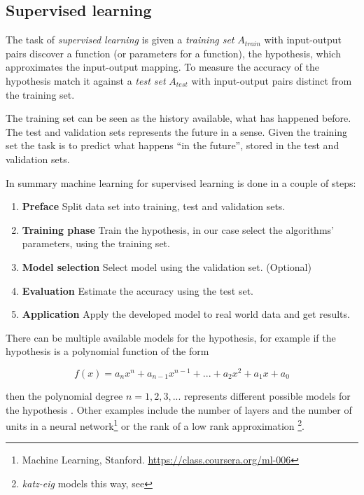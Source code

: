 
\subsection{Supervised learning}\label{sec:background:theory:suplearn}

The task of \textit{supervised learning} is given a \textit{training set} $A_{train}$ with input-output pairs discover a function (or parameters for a function), the hypothesis, which approximates the input-output mapping.  To measure the accuracy of the hypothesis match it against a \textit{test set} $A_{test}$ with input-output pairs distinct from the training set.
\citep{norvigAI}

The training set can be seen as the history available, what has happened before. The test and validation sets represents the future in a sense. Given the training set the task is to predict what happens ``in the future'', stored in the test and validation sets.

In summary machine learning for supervised learning is done in a couple of steps:

\begin{enumerate}
    \item \textbf{Preface} Split data set into training, test and validation sets.
    \item \textbf{Training phase} Train the hypothesis, in our case select the algorithms' parameters, using the training set.
    \item \textbf{Model selection} Select model using the validation set. (Optional)
    \item \textbf{Evaluation} Estimate the accuracy using the test set.
    \item \textbf{Application} Apply the developed model to real world data and get results.
\end{enumerate}

There can be multiple available models for the hypothesis, for example if the hypothesis is a polynomial function of the form

\begin{equation}
f(x) = a_n x^n + a_{n - 1} x^{n - 1} + ... + a_2 x^2 + a_1 x + a_0
\end{equation}

then the polynomial degree $n = 1, 2, 3, ...$ represents different possible models for the hypothesis \citep{norvigAI}. Other examples include the number of layers and the number of units in a neural network\footnote{Machine Learning, Stanford. \url{https://class.coursera.org/ml-006}}
or the rank of a low rank approximation
\footnote{\textit{katz-eig} models this way, see }.

